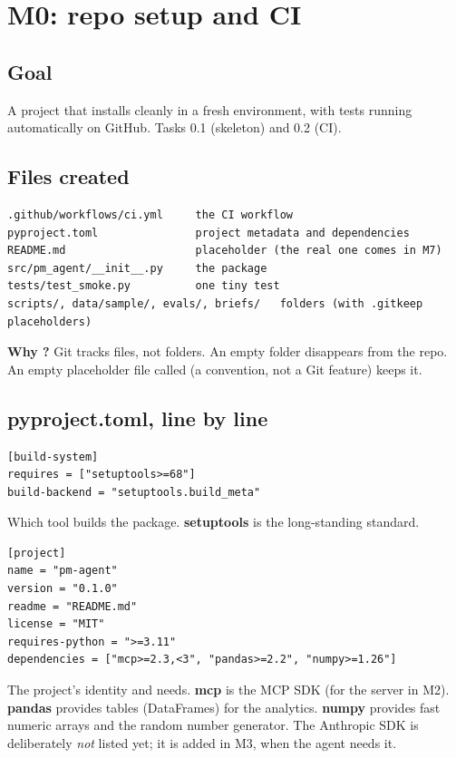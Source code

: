 \documentclass[11pt]{article}
\newcommand{\code}[1]{\texttt{\detokenize{#1}}}
\begin{document}
\section{M0: repo setup and CI}

\subsection{Goal}

A project that installs cleanly in a fresh environment, with tests running automatically on
GitHub. Tasks 0.1 (skeleton) and 0.2 (CI).

\subsection{Files created}

\begin{lstlisting}[style=plain]
.github/workflows/ci.yml     the CI workflow
pyproject.toml               project metadata and dependencies
README.md                    placeholder (the real one comes in M7)
src/pm_agent/__init__.py     the package
tests/test_smoke.py          one tiny test
scripts/, data/sample/, evals/, briefs/   folders (with .gitkeep placeholders)
\end{lstlisting}

\textbf{Why \code{.gitkeep}?} Git tracks files, not folders. An empty folder disappears from
the repo. An empty placeholder file called \code{.gitkeep} (a convention, not a Git feature)
keeps it.

\subsection{pyproject.toml, line by line}

\begin{lstlisting}[style=plain]
[build-system]
requires = ["setuptools>=68"]
build-backend = "setuptools.build_meta"
\end{lstlisting}
Which tool builds the package. \textbf{setuptools} is the long-standing standard.

\begin{lstlisting}[style=plain]
[project]
name = "pm-agent"
version = "0.1.0"
readme = "README.md"
license = "MIT"
requires-python = ">=3.11"
dependencies = ["mcp>=2.3,<3", "pandas>=2.2", "numpy>=1.26"]
\end{lstlisting}
The project's identity and needs. \textbf{mcp} is the MCP SDK (for the server in M2).
\textbf{pandas} provides tables (DataFrames) for the analytics. \textbf{numpy} provides fast
numeric arrays and the random number generator. The Anthropic SDK is deliberately \emph{not}
listed yet; it is added in M3, when the agent needs it.
\end{document}
